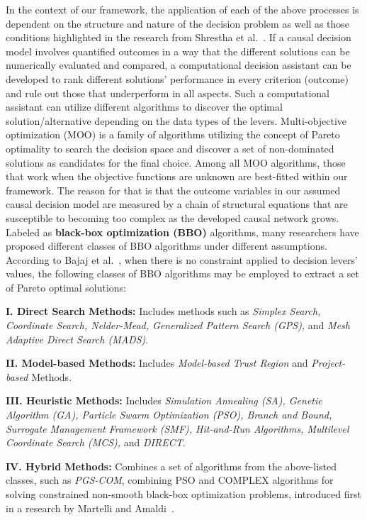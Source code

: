 \documentclass{sfuthesis}
\begin{document}
In the context of our framework, the application of each of the above processes is dependent on the structure and nature of the decision problem as well as those conditions highlighted in the research from Shrestha et al.~\cite{shrestha_organizational_2019}. If a causal decision model involves quantified outcomes in a way that the different solutions can be numerically evaluated and compared, a computational decision assistant can be developed to rank different solutions’ performance in every criterion (outcome) and rule out those that underperform in all aspects. Such a computational assistant can utilize different algorithms to discover the optimal solution/alternative depending on the data types of the levers. Multi-objective optimization (MOO) is a family of algorithms utilizing the concept of Pareto optimality to search the decision space and discover a set of non-dominated solutions as candidates for the final choice. Among all MOO algorithms, those that work when the objective functions are unknown are best-fitted within our framework. The reason for that is that the outcome variables in our assumed causal decision model are measured by a chain of structural equations that are susceptible to becoming too complex as the developed causal network grows. Labeled as \textbf{black-box optimization (BBO)} algorithms, many researchers have proposed different classes of BBO algorithms under different assumptions. According to Bajaj et al.~\cite{bajaj2021black}, when there is no constraint applied to decision levers’ values, the following classes of BBO algorithms may be employed to extract a set of Pareto optimal solutions:\par
\textbf{I. Direct Search Methods:} Includes methods such as \textit{Simplex Search, Coordinate Search, Nelder-Mead, Generalized Pattern Search (GPS),} and \textit{Mesh Adaptive Direct Search (MADS)}.\par
\textbf{II. Model-based Methods:} Includes \textit{Model-based Trust Region} and \textit{Project-based} Methods.\par
\textbf{III. Heuristic Methods:} Includes \textit{Simulation Annealing (SA), Genetic Algorithm (GA), Particle Swarm Optimization (PSO), Branch and Bound, Surrogate Management Framework (SMF), Hit-and-Run Algorithms, Multilevel Coordinate Search (MCS),} and \textit{DIRECT}.\par
\textbf{IV.	Hybrid Methods:} Combines a set of algorithms from the above-listed classes, such as \textit{PGS-COM}, combining PSO and COMPLEX algorithms for solving constrained non-smooth black-box optimization problems, introduced first in a research by Martelli and Amaldi~\cite{martelli2014pgs}.\par 
\end{document}
